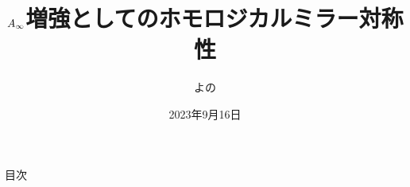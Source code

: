 \documentclass[aspectratio=169, dvipdfmx, 8pt, notheorems, uplatex]{beamer}
\title[]{$A_\infty$増強としてのホモロジカルミラー対称性}
\subtitle{}
\author[第4回 すうがく徒のつどい オンライン]{よの}
\date{2023年9月16日}
\begin{document}
\maketitle

\begin{frame}{目次}
  \tableofcontents
\end{frame}






\end{document}
